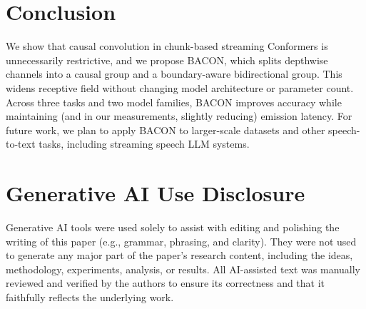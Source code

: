 \documentclass[cameraready]{Interspeech}
\begin{document}
\section{Conclusion}
\label{sec:conclusion}

We show that causal convolution in chunk-based streaming Conformers is
unnecessarily restrictive, and we propose BACON, which splits depthwise
channels into a causal group and a boundary-aware bidirectional group. This
widens receptive field without changing model architecture or parameter count.
Across three tasks and two model families, BACON improves accuracy while
maintaining (and in our measurements, slightly reducing) emission latency. For
future work, we plan to apply BACON to larger-scale datasets and other
speech-to-text tasks, including streaming speech LLM systems.

\section{Generative AI Use Disclosure}
\label{sec:genai}

Generative AI tools were used solely to assist with editing and polishing the
writing of this paper (e.g., grammar, phrasing, and clarity). They were not
used to generate any major part of the paper's research content, including the
ideas, methodology, experiments, analysis, or results. All AI-assisted text was
manually reviewed and verified by the authors to ensure its correctness and that
it faithfully reflects the underlying work.



\end{document}
